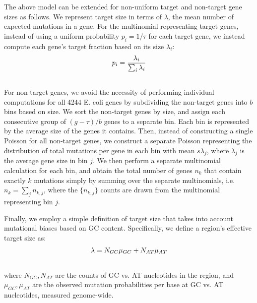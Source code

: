 \documentclass[letterpaper,10pt,english]{howto}
\begin{document}
The above model can be extended for non-uniform target and non-target
gene sizes as follows.  We represent target size in terms of
$\lambda$, the mean number of expected mutations in a gene.
For the multinomial representing target
genes, instead of using a uniform probability $p_i = 1/\tau$
for each target gene, we instead compute each gene's target fraction
based on its size $\lambda_i$:
\begin{gather}
\begin{split}p_i = \frac{\lambda_i}{\sum_i{\lambda_i}}\end{split}\notag\\\begin{split}\end{split}\notag
\end{gather}
For non-target genes, we avoid the necessity of performing individual
computations for all 4244 E. coli genes by subdividing the non-target
genes into $b$ bins based on size.  We sort the non-target genes by
size, and assign each consecutive group of $(g-\tau)/b$ genes
to a separate bin.  Each bin is represented by the average size of
the genes it contains.  Then, instead of constructing a single Poisson
for all non-target genes, we construct a separate Poisson representing
the distribution of total mutations per gene in each bin with
mean $s\overline{\lambda_j}$,
where $\overline{\lambda_j}$ is the
average gene size in bin $j$.  We then perform a separate
multinomial calculation for each bin, and obtain the total number
of genes $n_k$ that contain exactly $k$ mutations
simply by summing over the separate multinomials, i.e.
$n_k=\sum_j{n_{k,j}}$, where the $\{n_{k,j}\}$ counts
are drawn from the multinomial representing bin $j$.

Finally, we employ a simple definition of target size that takes
into account mutational biases based on GC content.  Specifically,
we define a region's effective target size as:
\begin{gather}
\begin{split}\lambda = N_{GC}\mu_{GC} + N_{AT}\mu_{AT}\end{split}\notag\\\begin{split}\end{split}\notag
\end{gather}
where $N_{GC},N_{AT}$ are the counts of GC vs. AT nucleotides
in the region, and $\mu_{GC},\mu_{AT}$ are the observed
mutation probabilities per base at GC vs. AT nucleotides, measured
genome-wide.
\end{document}
